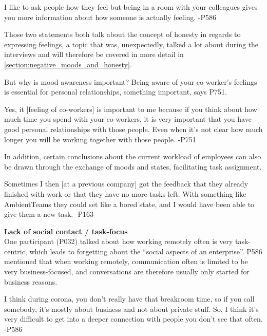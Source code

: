 \begin{displayquote}
    I like to ask people how they feel but being in a room with your colleagues gives you more information about how someone is actually feeling. -P586
\end{displayquote}

Those two statements both talk about the concept of honesty in regards to expressing feelings, a topic that was, unexpectedly, talked a lot about during the interviews and will therefore be covered in more detail in \autoref{section:negative_moods_and_honesty}.

But why is mood awareness important? Being aware of your co-worker's feelings is essential for personal relationships, something important, says P751.

\begin{displayquote}
    Yes, it [feeling of co-workers] is important to me because if you think about how much time you spend with your co-workers, it is very important that you have good personal relationships with those people. Even when it's not clear how much longer you will be working together with those people. -P751
\end{displayquote}

In addition, certain conclusions about the current workload of employees can also be drawn through the exchange of moods and states, facilitating task assignment.

\begin{displayquote}
    Sometimes I then [at a previous company] got the feedback that they already finished with work or that they have no more tasks left. With something like AmbientTeams they could set like a bored state, and I would have been able to give them a new task. -P163
\end{displayquote}

\medskip\noindent\textbf{Lack of social contact / task-focus} \\
One participant (P032) talked about how working remotely often is very task-centric, which leads to forgetting about the \enquote{social aspects of an enterprise}. P586 mentioned that when working remotely, communication often is limited to be very business-focused, and conversations are therefore usually only started for business reasons.

\begin{displayquote}
    I think during corona, you don't really have that breakroom time, so if you call somebody, it's mostly about business and not about private stuff. So, I think it's very difficult to get into a deeper connection with people you don't see that often. -P586
\end{displayquote}

